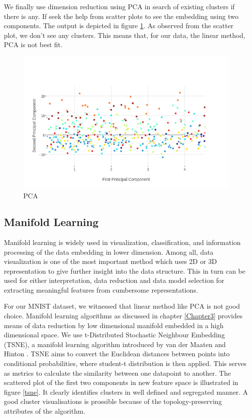 We finally use dimension reduction using PCA in search of existing clusters if there is any. If seek the help from scatter plots to see the embedding using two components. The output is depicted in figure \ref{pca_dr}. As observed from the scatter plot, we don't see any clusters. This means that, for our data, the linear method, PCA is not best fit.
\begin{figure}[h!]
\begin{center}
\includegraphics[width=\textwidth]{./Figures/pca_dr.png}
\caption {PCA}
\label{pca_dr} 
\end{center}
\end{figure}

\subsection{Manifold Learning}
Manifold learning is widely used in visualization, classification, and information processing of the data embedding in lower dimension.  Among all, data visualization is one of the most important method which uses 2D or 3D representation to give further insight into the data structure. This in turn can be used for either interpretation, data reduction and data model selection for extracting meaningful features from cumbersome representations. 

For our MNIST dataset, we witnessed that linear method like PCA is not good choice. Manifold learning algorithms as discussed in chapter \ref{Chapter3} provides means of data reduction by low dimensional manifold embedded in a high dimensional space. We use  t-Distributed Stochastic Neighbour Embedding (TSNE), a manifold learning algorithm introduced by van der Maaten and Hinton 
\citep{Van2008}. TSNE aims to convert the Euclidean distances between points into conditional probabilities, where student-t distribution is then applied. This serves as metrics to calculate the similarity between one datapoint to another. The scattered plot of the first two components in new feature space is illustrated in figure \ref{tsne}. It clearly identifies clusters in well defined and segregated manner. A  good cluster visualisations is prossible because of the topology-preserving attributes of the algorithm.

